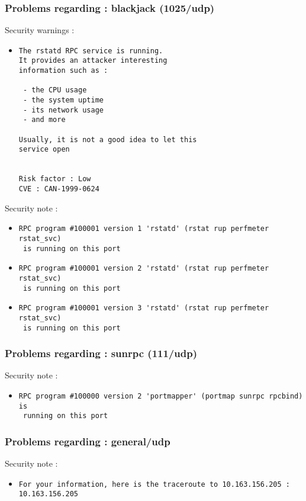 \documentclass{article}
\begin{document}
\subsubsection{Problems regarding : blackjack (1025/udp)}
Security warnings :\\
\begin{itemize}
\item \begin{verbatim}
The rstatd RPC service is running. 
It provides an attacker interesting
information such as :

 - the CPU usage
 - the system uptime
 - its network usage
 - and more
 
Usually, it is not a good idea to let this
service open


Risk factor : Low
CVE : CAN-1999-0624
\end{verbatim}\end{itemize}
Security note :\\
\begin{itemize}
\item \begin{verbatim}
RPC program #100001 version 1 'rstatd' (rstat rup perfmeter rstat_svc)
 is running on this port
\end{verbatim}\item \begin{verbatim}
RPC program #100001 version 2 'rstatd' (rstat rup perfmeter rstat_svc)
 is running on this port
\end{verbatim}\item \begin{verbatim}
RPC program #100001 version 3 'rstatd' (rstat rup perfmeter rstat_svc)
 is running on this port
\end{verbatim}\end{itemize}
\subsubsection{Problems regarding : sunrpc (111/udp)}
Security note :\\
\begin{itemize}
\item \begin{verbatim}
RPC program #100000 version 2 'portmapper' (portmap sunrpc rpcbind) is
 running on this port
\end{verbatim}\end{itemize}
\subsubsection{Problems regarding : general/udp}
Security note :\\
\begin{itemize}
\item \begin{verbatim}
For your information, here is the traceroute to 10.163.156.205 : 
10.163.156.205

\end{verbatim}\end{itemize}
\end{document}
